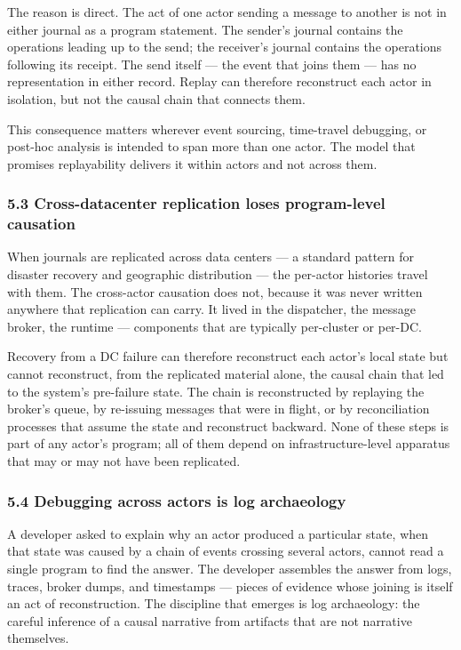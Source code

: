 \documentclass[
]{article}
\begin{document}
The reason is direct. The act of one actor sending a message to another
is not in either journal as a program statement. The sender's journal
contains the operations leading up to the send; the receiver's journal
contains the operations following its receipt. The send itself --- the
event that joins them --- has no representation in either record. Replay
can therefore reconstruct each actor in isolation, but not the causal
chain that connects them.

This consequence matters wherever event sourcing, time-travel debugging,
or post-hoc analysis is intended to span more than one actor. The model
that promises replayability delivers it within actors and not across
them.

\subsubsection{5.3 Cross-datacenter replication loses program-level
causation}\label{cross-datacenter-replication-loses-program-level-causation}

When journals are replicated across data centers --- a standard pattern
for disaster recovery and geographic distribution --- the per-actor
histories travel with them. The cross-actor causation does not, because
it was never written anywhere that replication can carry. It lived in
the dispatcher, the message broker, the runtime --- components that are
typically per-cluster or per-DC.

Recovery from a DC failure can therefore reconstruct each actor's local
state but cannot reconstruct, from the replicated material alone, the
causal chain that led to the system's pre-failure state. The chain is
reconstructed by replaying the broker's queue, by re-issuing messages
that were in flight, or by reconciliation processes that assume the
state and reconstruct backward. None of these steps is part of any
actor's program; all of them depend on infrastructure-level apparatus
that may or may not have been replicated.

\subsubsection{5.4 Debugging across actors is log
archaeology}\label{debugging-across-actors-is-log-archaeology}

A developer asked to explain why an actor produced a particular state,
when that state was caused by a chain of events crossing several actors,
cannot read a single program to find the answer. The developer assembles
the answer from logs, traces, broker dumps, and timestamps --- pieces of
evidence whose joining is itself an act of reconstruction. The
discipline that emerges is log archaeology: the careful inference of a
causal narrative from artifacts that are not narrative themselves.
\end{document}
